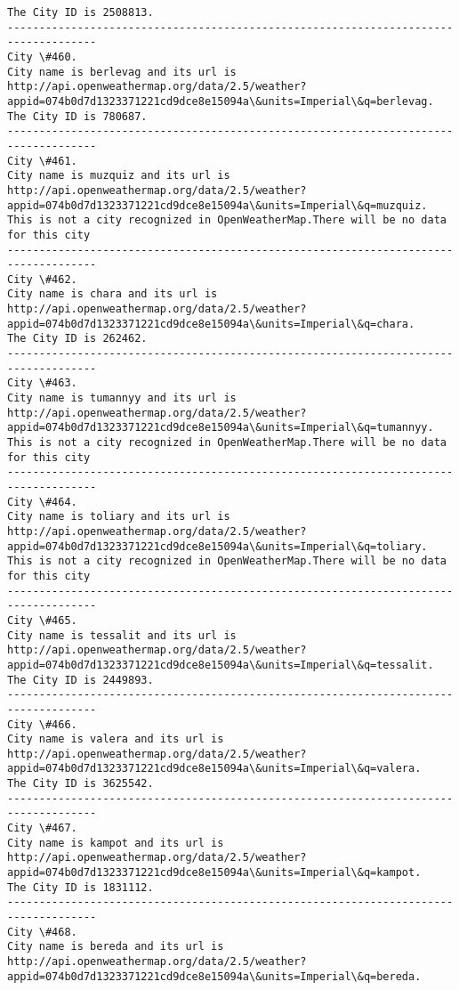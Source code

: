 \documentclass[11pt]{article}
\begin{document}
\begin{Verbatim}[commandchars=\\\{\}]
The City ID is 2508813.
------------------------------------------------------------------------------------
City \#460.
City name is berlevag and its url is http://api.openweathermap.org/data/2.5/weather?appid=074b0d7d1323371221cd9dce8e15094a\&units=Imperial\&q=berlevag.
The City ID is 780687.
------------------------------------------------------------------------------------
City \#461.
City name is muzquiz and its url is http://api.openweathermap.org/data/2.5/weather?appid=074b0d7d1323371221cd9dce8e15094a\&units=Imperial\&q=muzquiz.
This is not a city recognized in OpenWeatherMap.There will be no data for this city
------------------------------------------------------------------------------------
City \#462.
City name is chara and its url is http://api.openweathermap.org/data/2.5/weather?appid=074b0d7d1323371221cd9dce8e15094a\&units=Imperial\&q=chara.
The City ID is 262462.
------------------------------------------------------------------------------------
City \#463.
City name is tumannyy and its url is http://api.openweathermap.org/data/2.5/weather?appid=074b0d7d1323371221cd9dce8e15094a\&units=Imperial\&q=tumannyy.
This is not a city recognized in OpenWeatherMap.There will be no data for this city
------------------------------------------------------------------------------------
City \#464.
City name is toliary and its url is http://api.openweathermap.org/data/2.5/weather?appid=074b0d7d1323371221cd9dce8e15094a\&units=Imperial\&q=toliary.
This is not a city recognized in OpenWeatherMap.There will be no data for this city
------------------------------------------------------------------------------------
City \#465.
City name is tessalit and its url is http://api.openweathermap.org/data/2.5/weather?appid=074b0d7d1323371221cd9dce8e15094a\&units=Imperial\&q=tessalit.
The City ID is 2449893.
------------------------------------------------------------------------------------
City \#466.
City name is valera and its url is http://api.openweathermap.org/data/2.5/weather?appid=074b0d7d1323371221cd9dce8e15094a\&units=Imperial\&q=valera.
The City ID is 3625542.
------------------------------------------------------------------------------------
City \#467.
City name is kampot and its url is http://api.openweathermap.org/data/2.5/weather?appid=074b0d7d1323371221cd9dce8e15094a\&units=Imperial\&q=kampot.
The City ID is 1831112.
------------------------------------------------------------------------------------
City \#468.
City name is bereda and its url is http://api.openweathermap.org/data/2.5/weather?appid=074b0d7d1323371221cd9dce8e15094a\&units=Imperial\&q=bereda.

\end{Verbatim}
\end{document}

